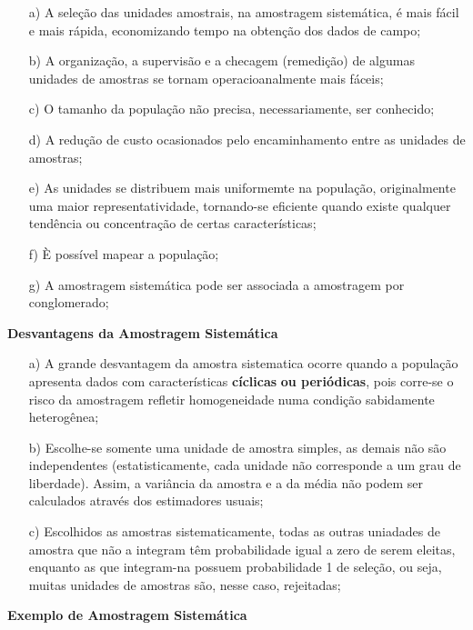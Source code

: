 \begin{enumerate}
  \item[{a)}] A seleção das unidades amostrais, na amostragem sistemática, é mais fácil e mais rápida, economizando tempo na obtenção dos dados de campo;
  \item[{b)}] A organização, a supervisão e a checagem (remedição) de algumas unidades de amostras se tornam operacioanalmente mais fáceis;
  \item[{c)}] O tamanho da população não precisa, necessariamente, ser conhecido;
  \item[{d)}] A redução de custo ocasionados pelo encaminhamento entre as unidades de amostras;
  \item[{e)}] As unidades se distribuem mais uniformemte na população, originalmente uma maior representatividade, tornando-se eficiente quando existe qualquer tendência ou concentração de certas características;
  \item[{f)}] È possível mapear a população;
  \item[{g)}] A amostragem sistemática pode ser associada  a amostragem por conglomerado;
\end{enumerate}



\textbf{Desvantagens da Amostragem Sistemática}
\vskip0.3cm


\begin{enumerate}
  \item[{a)}] A grande desvantagem da amostra sistematica ocorre
  quando a população apresenta dados com características \textbf{cíclicas}
  \textbf{ou periódicas}, pois corre-se o risco da amostragem refletir
  homogeneidade numa condição sabidamente heterogênea;
  \item[{b)}] Escolhe-se somente uma unidade de amostra simples, as demais não são independentes (estatisticamente, cada unidade não corresponde a um grau de liberdade). Assim, a variância da amostra e a da média não podem ser calculados através dos estimadores usuais;
  \item[{c)}] Escolhidos as amostras sistematicamente, todas as outras uniadades de amostra que não a integram têm probabilidade igual a zero de serem eleitas, enquanto as que integram-na possuem probabilidade 1 de seleção, ou seja, muitas unidades de amostras são, nesse caso, rejeitadas;
\end{enumerate}

\textbf{Exemplo de Amostragem Sistemática}
\vskip0.3cm

